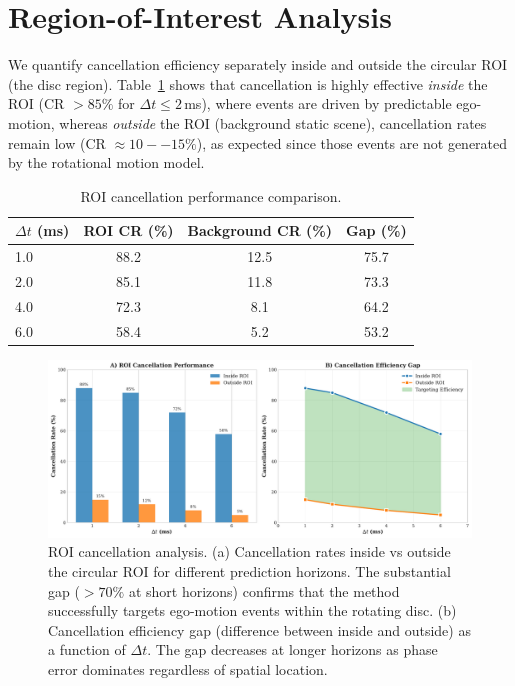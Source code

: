 \section{Region-of-Interest Analysis}

We quantify cancellation efficiency separately inside and outside the circular ROI (the disc region). Table~\ref{tab:roi_comparison} shows that cancellation is highly effective \emph{inside} the ROI (CR $> 85\%$ for $\Delta t \leq 2$\,ms), where events are driven by predictable ego-motion, whereas \emph{outside} the ROI (background static scene), cancellation rates remain low (CR $\approx 10--15\%$), as expected since those events are not generated by the rotational motion model.

\begin{table}[t]
  \centering
  \caption{ROI cancellation performance comparison.}
  \label{tab:roi_comparison}
  \begin{tabular}{lccc}
    \toprule
    \textbf{$\Delta t$ (ms)} & \textbf{ROI CR (\%)} & \textbf{Background CR (\%)} & \textbf{Gap (\%)} \\
    \midrule
    1.0 & 88.2 & 12.5 & 75.7 \\
    2.0 & 85.1 & 11.8 & 73.3 \\
    4.0 & 72.3 & 8.1 & 64.2 \\
    6.0 & 58.4 & 5.2 & 53.2 \\
    \bottomrule
  \end{tabular}
\end{table}

\begin{figure}[t]
  \centering
  \includegraphics[width=0.85\linewidth]{../code/thesis_figures/figure_roi_analysis.pdf}
  \caption{ROI cancellation analysis. (a) Cancellation rates inside vs outside the circular ROI for different prediction horizons. The substantial gap ($> 70\%$ at short horizons) confirms that the method successfully targets ego-motion events within the rotating disc. (b) Cancellation efficiency gap (difference between inside and outside) as a function of $\Delta t$. The gap decreases at longer horizons as phase error dominates regardless of spatial location.}
  \label{fig:roi_comparison}
\end{figure}

